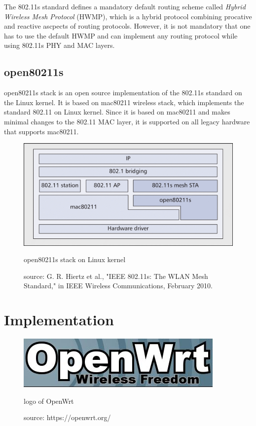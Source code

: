The 802.11s standard defines a mandatory default routing scheme called \textit{Hybrid Wireless Mesh Protocol} (HWMP), which is a hybrid protocol combining procative and reactive ascpects of routing protocols. However, it is not mandatory that one has to use the default HWMP and can implement any routing protocol while using 802.11s PHY and MAC layers.

\subsection{open80211s}
open80211s stack is an open source implementation of the 802.11s standard on the Linux kernel. It is based on mac80211 wireless stack, which implements the standard 802.11 on Linux kernel. Since it is based on mac80211 and makes minimal changes to the 802.11 MAC layer, it is supported on all legacy hardware that supports mac80211.

\begin{figure}
	\centering
	\includegraphics[scale=0.3]{Pictures/open80211s.png}
	\caption{open80211s stack on Linux kernel}
	\label{fig: open80211s}
	\caption*{source: G. R. Hiertz et al., "IEEE 802.11s: The WLAN Mesh Standard," in IEEE Wireless Communications, February 2010.}
\end{figure}

\section{Implementation}

\begin{figure}[h]
	\centering
	\includegraphics[scale=1]{Pictures/openwrt_logo.jpg}
	\caption{logo of OpenWrt}
	\label{fig: openwrt}
	\caption*{source: https://openwrt.org/}
\end{figure}


